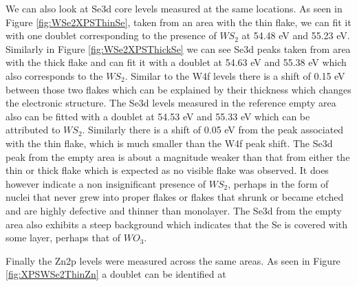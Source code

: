 We can also look at Se3d core levels measured at the same locations. As seen in Figure \ref{fig:WSe2XPSThinSe}, taken from an area with the thin flake, we can fit it with one doublet corresponding to the presence of $WS_2$ at 54.48 eV and 55.23 eV. Similarly in Figure \ref{fig:WSe2XPSThickSe} we can see Se3d peaks taken from area with the thick flake and can fit it with a doublet at 54.63 eV and 55.38 eV which also corresponds to the $WS_2$. Similar to the W4f levels there is a shift of 0.15 eV between those two flakes which can be explained by their thickness which changes the electronic structure. The Se3d levels measured in the reference empty area also can be fitted with a doublet at 54.53 eV and 55.33 eV which can be attributed to $WS_2$. Similarly there is a shift of 0.05 eV from the peak associated with the thin flake, which is much smaller than the W4f peak shift. The Se3d peak from the empty area is about a magnitude weaker than that from either the thin or thick flake which is expected as no visible flake was observed. It does however indicate a non insignificant presence of $WS_2$, perhaps in the form of nuclei that never grew into proper flakes or flakes that shrunk or became etched and are highly defective and thinner than monolayer. The Se3d from the empty area also exhibits a steep background which indicates that the Se is covered with some layer, perhaps that of $WO_3$. 

Finally the Zn2p levels were measured across the same areas. As seen in Figure \ref{fig:XPSWSe2ThinZn} a doublet can be identified at 